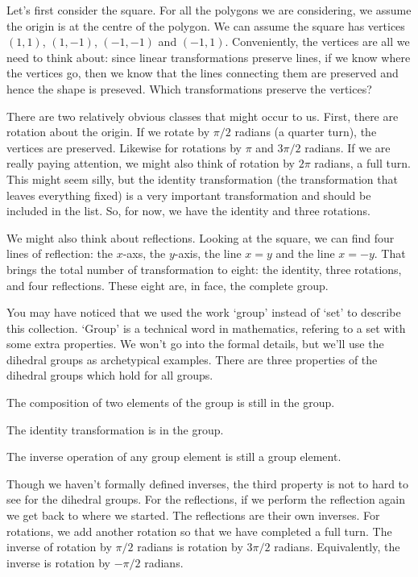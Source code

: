\documentclass[fleqn]{report}
\begin{document}
\begin{example}
Let's first consider the square. For all the polygons we are
considering, we assume the origin is at the centre of the
polygon. We can assume the square has vertices $(1,1)$,
$(1,-1)$, $(-1,-1)$ and $(-1,1)$. Conveniently, the vertices
are all we need to think about: since linear transformations
preserve lines, if we know where the vertices go, then we know
that the lines connecting them are preserved and hence the
shape is preseved. Which transformations preserve the
vertices?

There are two relatively obvious classes that might occur to us.
First, there are rotation about the origin. If we rotate by
$\pi/2$ radians (a quarter turn), the vertices are preserved.
Likewise for rotations by $\pi$ and $3\pi/2$ radians. If we
are really paying attention, we might also think of rotation
by $2\pi$ radians, a full turn. This might seem silly, but
the identity transformation (the transformation that leaves
everything fixed) is a very important transformation and
should be included in the list. So, for now, we have the
identity and three rotations.

We might also think about reflections. Looking at the square,
we can find four lines of reflection: the $x$-axs, the
$y$-axis, the line $x=y$ and the line $x=-y$. That brings the
total number of transformation to eight: the identity, three
rotations, and four reflections. These eight are, in face, the
complete group.
\end{example}

You may have noticed that we used the work `group' instead of
`set' to describe this collection. `Group' is a technical
word in mathematics, refering to a set with some extra
properties. We won't go into the formal details, but we'll
use the dihedral groups as archetypical examples.
There are three properties of the dihedral groups which
hold for all groups.

\begin{smallitemize}
\item The composition of two elements of the group is still in
the group.
\item The identity transformation is in the group.
\item The inverse operation of any group element is still a
group element.
\end{smallitemize} 

Though we haven't formally defined inverses, the third
property is not to hard to see for the dihedral
groups. For the reflections, if we perform the reflection
again we get back to where we started. The reflections are
their own inverses. For rotations, we add another rotation
so that we have completed a full turn. The inverse of
rotation by $\pi/2$ radians is rotation by $3\pi/2$ radians.
Equivalently, the inverse is rotation by $-\pi/2$ radians.
\end{document}
